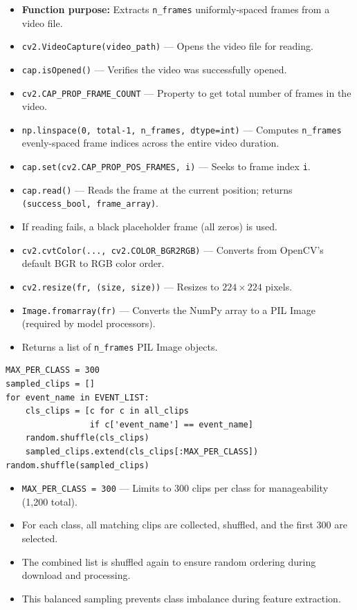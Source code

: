 \begin{explanation}
\begin{itemize}[nosep]
  \item \textbf{Function purpose:} Extracts \texttt{n\_frames} uniformly-spaced frames from a video file.
  \item \texttt{cv2.VideoCapture(video\_path)} --- Opens the video file for reading.
  \item \texttt{cap.isOpened()} --- Verifies the video was successfully opened.
  \item \texttt{cv2.CAP\_PROP\_FRAME\_COUNT} --- Property to get total number of frames in the video.
  \item \texttt{np.linspace(0, total-1, n\_frames, dtype=int)} --- Computes \texttt{n\_frames} evenly-spaced frame indices across the entire video duration.
  \item \texttt{cap.set(cv2.CAP\_PROP\_POS\_FRAMES, i)} --- Seeks to frame index \texttt{i}.
  \item \texttt{cap.read()} --- Reads the frame at the current position; returns \texttt{(success\_bool, frame\_array)}.
  \item If reading fails, a black placeholder frame (all zeros) is used.
  \item \texttt{cv2.cvtColor(..., cv2.COLOR\_BGR2RGB)} --- Converts from OpenCV's default BGR to RGB color order.
  \item \texttt{cv2.resize(fr, (size, size))} --- Resizes to $224 \times 224$ pixels.
  \item \texttt{Image.fromarray(fr)} --- Converts the NumPy array to a PIL Image (required by model processors).
  \item Returns a list of \texttt{n\_frames} PIL Image objects.
\end{itemize}
\end{explanation}

\begin{lstlisting}
MAX_PER_CLASS = 300
sampled_clips = []
for event_name in EVENT_LIST:
    cls_clips = [c for c in all_clips
                 if c['event_name'] == event_name]
    random.shuffle(cls_clips)
    sampled_clips.extend(cls_clips[:MAX_PER_CLASS])
random.shuffle(sampled_clips)
\end{lstlisting}

\begin{explanation}
\begin{itemize}[nosep]
  \item \texttt{MAX\_PER\_CLASS = 300} --- Limits to 300 clips per class for manageability (1,200 total).
  \item For each class, all matching clips are collected, shuffled, and the first 300 are selected.
  \item The combined list is shuffled again to ensure random ordering during download and processing.
  \item This balanced sampling prevents class imbalance during feature extraction.
\end{itemize}
\end{explanation}

